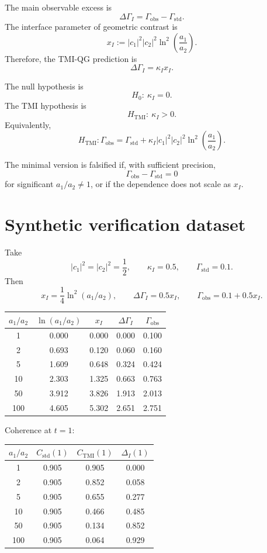 \documentclass[12pt,a4paper]{article}
\newcommand{\std}{\mathrm{std}}
\newcommand{\obs}{\mathrm{obs}}
\begin{document}
The main observable excess is
\[
\Delta\Gamma_I=\Gamma_{\obs}-\Gamma_{\std}.
\]
The interface parameter of geometric contrast is
\[
\boxed{
x_I:=|c_1|^2|c_2|^2
\ln^2\left(\frac{a_1}{a_2}\right).
}
\]
Therefore, the TMI-QG prediction is
\[
\boxed{
\Delta\Gamma_I=\kappa_I x_I.
}
\]

The null hypothesis is
\[
\boxed{H_0:\ \kappa_I=0.}
\]
The TMI hypothesis is
\[
\boxed{H_{\mathrm{TMI}}:\ \kappa_I>0.}
\]
Equivalently,
\[
\boxed{
H_{\mathrm{TMI}}:
\Gamma_{\obs}
=
\Gamma_{\std}
+
\kappa_I |c_1|^2|c_2|^2
\ln^2\left(\frac{a_1}{a_2}\right).
}
\]

The minimal version is falsified if, with sufficient precision,
\[
\Gamma_{\obs}-\Gamma_{\std}=0
\]
for significant \(a_1/a_2\neq1\), or if the dependence does not scale as \(x_I\).

\section{Synthetic verification dataset}

Take
\[
|c_1|^2=|c_2|^2=\frac12,
\qquad
\kappa_I=0.5,
\qquad
\Gamma_{\std}=0.1.
\]
Then
\[
x_I=\frac14\ln^2(a_1/a_2),
\qquad
\Delta\Gamma_I=0.5x_I,
\qquad
\Gamma_{\obs}=0.1+0.5x_I.
\]

\begin{center}
\begin{tabular}{ccccc}
\toprule
\(a_1/a_2\) & \(\ln(a_1/a_2)\) & \(x_I\) & \(\Delta\Gamma_I\) & \(\Gamma_{\obs}\)\\
\midrule
1 & 0.000 & 0.000 & 0.000 & 0.100\\
2 & 0.693 & 0.120 & 0.060 & 0.160\\
5 & 1.609 & 0.648 & 0.324 & 0.424\\
10 & 2.303 & 1.325 & 0.663 & 0.763\\
50 & 3.912 & 3.826 & 1.913 & 2.013\\
100 & 4.605 & 5.302 & 2.651 & 2.751\\
\bottomrule
\end{tabular}
\end{center}

Coherence at \(t=1\):
\begin{center}
\begin{tabular}{cccc}
\toprule
\(a_1/a_2\) & \(C_{\std}(1)\) & \(C_{\mathrm{TMI}}(1)\) & \(\Delta_I(1)\)\\
\midrule
1 & 0.905 & 0.905 & 0.000\\
2 & 0.905 & 0.852 & 0.058\\
5 & 0.905 & 0.655 & 0.277\\
10 & 0.905 & 0.466 & 0.485\\
50 & 0.905 & 0.134 & 0.852\\
100 & 0.905 & 0.064 & 0.929\\
\bottomrule
\end{tabular}
\end{center}
\end{document}
